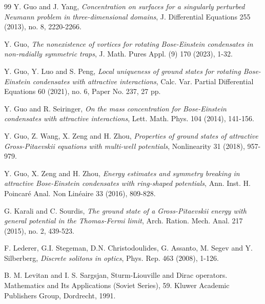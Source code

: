 \documentclass[10pt, reqno]{amsart}
\numberwithin{equation}{section}
\theoremstyle{definition}
\begin{document}
{\begin{thebibliography}{99}
Y. Guo and J. Yang,
\emph{Concentration on surfaces for a singularly perturbed Neumann problem in three-dimensional domains},
J. Differential Equations 255 (2013), no. 8, 2220-2266.

Y. Guo,
\emph{ The nonexistence of vortices for rotating Bose-Einstein condensates in non-radially symmetric traps},
 J. Math. Pures Appl. (9) 170 (2023), 1-32.

Y. Guo, Y. Luo and S. Peng,
\emph{Local uniqueness of ground states for rotating Bose-Einstein condensates with attractive interactions},
 Calc. Var. Partial Differential Equations 60 (2021), no. 6, Paper No. 237, 27 pp.

Y. Guo and R. Seiringer,
\emph{On the mass concentration for Bose-Einstein condensates with attractive interactions},
Lett. Math. Phys.
104 (2014), 141-156.




Y. Guo, Z. Wang, X. Zeng and H. Zhou,
\emph{Properties of ground states of attractive Gross-Pitaevskii equations with multi-well potentials},
Nonlinearity
31 (2018), 957-979.


Y. Guo, X. Zeng and H. Zhou,
\emph{Energy estimates and symmetry breaking in attractive Bose-Einstein condensates with ring-shaped potentials},
Ann. Inst. H. Poincar\'e Anal. Non Lin\'eaire
33 (2016), 809-828.




G. Karali and C. Sourdis,
\emph{The ground state of a Gross-Pitaevskii energy with general potential in the Thomas-Fermi limit},
Arch. Ration. Mech. Anal.
217 (2015), no. 2, 439-523.

F. Lederer, G.I. Stegeman, D.N. Christodoulides, G. Assanto, M. Segev and Y. Silberberg,
\emph{Discrete solitons in optics},
Phys. Rep.
463 (2008), 1-126.

B. M. Levitan and I. S. Sargsjan,
Sturm-Liouville and Dirac operators. Mathematics and Its Applications
(Soviet Series), 59. Kluwer Academic Publishers Group, Dordrecht, 1991.



\end{thebibliography}}
\end{document}
